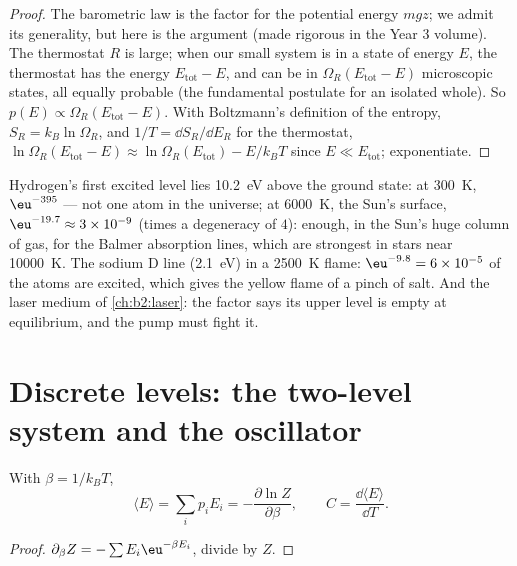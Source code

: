 \begin{proof}
The barometric law is the factor for the potential energy $mgz$; we
admit its generality, but here is the argument (made rigorous in the
Year 3 volume). The thermostat $R$ is large; when our small system is in
a state of energy $E$, the thermostat has the energy $E_{\text{tot}} -
E$, and can be in $\Omega_R(E_{\text{tot}} - E)$ microscopic states, all
equally probable (the fundamental postulate for an isolated whole). So
$p(E) \propto \Omega_R(E_{\text{tot}} - E)$. With Boltzmann's definition
of the entropy, $S_R = k_B\ln\Omega_R$, and $1/T = \dd S_R/\dd E_R$ for the
thermostat, $\ln\Omega_R(E_{\text{tot}} - E) \approx \ln\Omega_R(E_{\text{tot}})
- E/k_BT$ since $E \ll E_{\text{tot}}$; exponentiate.
\end{proof}

\begin{example}\label{ex:b2:boltzmann-factor:levels}
Hydrogen's first excited level lies \qty{10.2}{eV} above the ground
state: at \qty{300}{K}, $\eu^{-395}$ --- not one atom in the universe; at
\qty{6000}{K}, the Sun's surface, $\eu^{-19.7} \approx 3 \times 10^{-9}$ (times
a degeneracy of $4$): enough, in the Sun's huge column of gas, for the
Balmer absorption lines, which are strongest in stars near \qty{10000}{K}.
The sodium D line (\qty{2.1}{eV}) in a \qty{2500}{K} flame: $\eu^{-9.8} = 6
\times 10^{-5}$ of the atoms are excited, which gives the yellow flame of a
pinch of salt. And the laser medium of \cref{ch:b2:laser}: the factor
says its upper level is empty at equilibrium, and the pump must fight
it.
\end{example}

\section{Discrete levels: the two-level system and the oscillator}

\begin{proposition}\label{prop:b2:boltzmann-factor:meanE}
With $\beta = 1/k_BT$,
\[
\langle E\rangle = \sum_ip_iE_i = -\frac{\partial\ln Z}{\partial\beta}, \qquad
C = \frac{\dd\langle E\rangle}{\dd T} .
\]
\end{proposition}

\begin{proof}
$\partial_\beta Z = -\sum E_i\eu^{-\beta E_i}$, divide by $Z$.
\end{proof}

